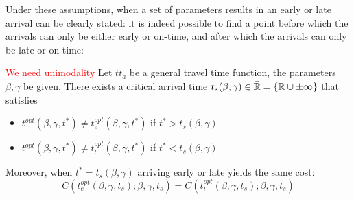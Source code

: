 Under these assumptions, when a set of parameters results in an early or late arrival can be clearly stated:
it is indeed possible to find a point before which the arrivals can only be either early or on-time,
and after which the arrivals can only be late or on-time:

\begin{prop}
  \label{prop:split-early-late}
  \textcolor{red}{We need unimodality}
  Let \(tt_a\) be a general travel time function, the parameters \(\beta, \gamma\) be given.
  There exists a critical arrival time \(t_s(\beta, \gamma) \in \bar{\mathbb{R}} = \{\mathbb{R} \cup \pm \infty\}\) that satisfies
  \begin{itemize}
  \item \(t^{opt}(\beta, \gamma, t^*) \neq t_e^{opt}(\beta, \gamma, t^*)\) if \(t^* > t_s(\beta, \gamma)\)
  \item \(t^{opt}(\beta, \gamma, t^*) \neq t_l^{opt}(\beta, \gamma, t^*)\) if \(t^* < t_s(\beta, \gamma)\)
  \end{itemize}

  Moreover, when \(t^* = t_s(\beta, \gamma)\) arriving early or late yields the same cost:
  \begin{equation*}
    C(t_e^{opt}(\beta, \gamma, t_s); \beta, \gamma, t_s) = C(t_l^{opt}(\beta, \gamma, t_s); \beta, \gamma, t_s)
  \end{equation*}
\end{prop}
